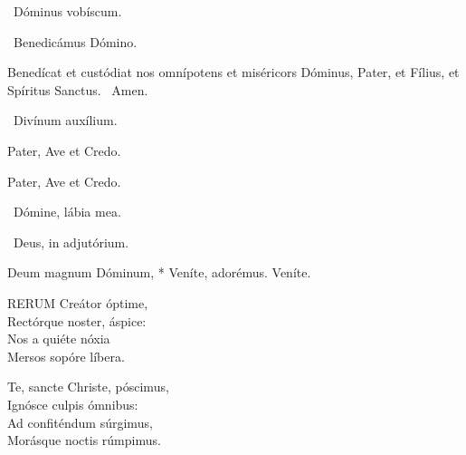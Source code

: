 \V\ Dóminus vobíscum.

\V\ Benedicámus Dómino.

 Benedícat et custódiat nos omnípotens et miséricors Dóminus, Pater, et Fílius, et Spíritus Sanctus. \R\ Amen.


\V\ Divínum auxílium.

Pater, Ave et Credo.



Pater, Ave et Credo.

\V\ Dómine, lábia mea.

\V\ Deus, in adjutórium.


 Deum magnum Dóminum, * Veníte, adorémus.  Veníte.


\lettrine[lines=2]{R}{ERUM} Creátor óptime,\\
Rectórque noster, áspice:\\
Nos a quiéte nóxia\\
Mersos sopóre líbera.

Te, sancte Christe, póscimus,\\
Ignósce culpis ómnibus:\\
Ad confiténdum súrgimus,\\
Morásque noctis rúmpimus.

